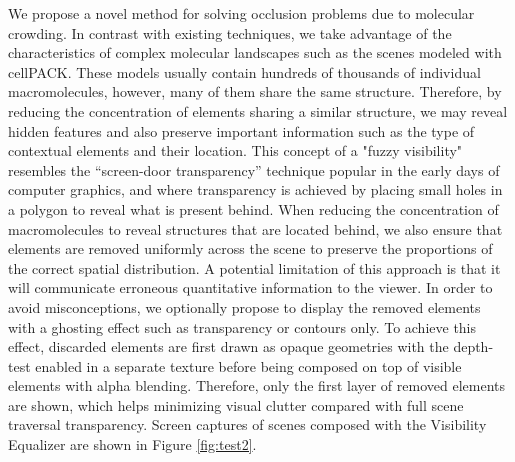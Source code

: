 We propose a novel method for solving occlusion problems due to molecular crowding.
In contrast with existing techniques, we take advantage of the characteristics of complex molecular landscapes such as the scenes modeled with cellPACK.
These models usually contain hundreds of thousands of individual macromolecules, however, many of them share the same structure.
Therefore, by reducing the concentration of elements sharing a similar structure, we may reveal hidden features and also preserve important information such as the type of contextual elements and their location.
This concept of a "fuzzy visibility" resembles the “screen-door transparency” technique popular in the early days of computer graphics, and where transparency is achieved by placing small holes in a polygon to reveal what is present behind.
When reducing the concentration of macromolecules to reveal structures that are located behind, we also ensure that elements are removed uniformly across the scene to preserve the proportions of the correct spatial distribution.
A potential limitation of this approach is that it will communicate erroneous quantitative information to the viewer.
In order to avoid misconceptions, we optionally propose to display the removed elements with a ghosting effect such as transparency or contours only.
To achieve this effect, discarded elements are first drawn as opaque geometries with the depth-test enabled in a separate texture before being composed on top of visible elements with alpha blending.
Therefore, only the first layer of removed elements are shown, which helps minimizing visual clutter compared with full scene traversal transparency.
Screen captures of scenes composed with the Visibility Equalizer are shown in Figure \ref{fig:test2}.

